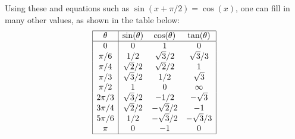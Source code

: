 \documentclass[a4paper]{book}
\theoremstyle{definition}
\begin{document}
Using these
and equations such as $\sin(x+\pi/2)=\cos(x)$, one can fill in many
other values, as shown in the table below:
\[ \begin{array}{|c|ccc|}
    \hline
    \theta    & \sin(\theta)  & \cos(\theta) & \tan(\theta) \\
    \hline
      0     & 0           & 1           & 0         \\
      \pi/6 & 1/2         & \sqrt{3}/2       & \sqrt{3}/3     \\
      \pi/4 & \sqrt{2}/2       & \sqrt{2}/2       & 1         \\
      \pi/3 & \sqrt{3}/2       & 1/2         & \sqrt{3}       \\
      \pi/2 & 1           & 0           & \infty    \\
     2\pi/3 & \sqrt{3}/2       & -1/2        & -\sqrt{3}      \\
     3\pi/4 & \sqrt{2}/2       & -\sqrt{2}/2      & -1        \\
     5\pi/6 & 1/2         & -\sqrt{3}/2      & -\sqrt{3}/3    \\
      \pi   & 0           & -1          & 0         \\
   \hline
  \end{array}
\]
\end{document}
